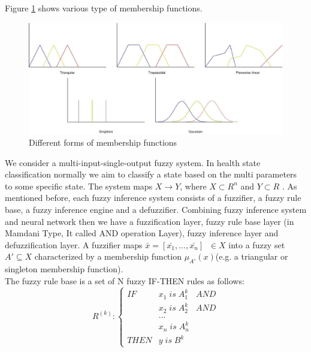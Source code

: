 Figure \ref{fig:Different forms of membership functions} shows various type of membership functions.
\begin{figure}[H]
    \centering
    \includegraphics[width=12cm]{gfx/membership_function.png}
    \vspace{0.3cm}
    \captionsetup{justification=centering}
    \caption{Different forms of membership functions}
    \label{fig:Different forms of membership functions}
\end{figure}
\vspace*{-4mm}
We consider a multi-input-single-output fuzzy system. In health state classification normally we aim to classify a state based on the multi parameters to some specific state. The system maps $X\rightarrow Y$, where $X\subset R^{n}$ and $Y \subset R$ . As mentioned before, each fuzzy inference system consists of a fuzzifier, a fuzzy rule base, a fuzzy inference engine and a defuzzifier. Combining fuzzy inference system and neural network then we have a fuzzification layer, fuzzy rule base layer (in Mamdani Type, It called AND operation Layer), fuzzy inference layer and defuzzification layer. A fuzzifier maps $\bar{x}=\left[\bar{x_{1}},...,\bar{x_{n}}\right]\;\;\in X$ into a fuzzy set ${A}'\subseteq X$ characterized by a membership function $\mu_{{A}'}\left(x\right)$(e.g. a triangular or singleton membership function).
\\
The fuzzy rule base is a set of N fuzzy IF-THEN rules as follows:
\begin{equation}
   R^{\left ( k \right )} : \left\{\begin{matrix}
IF   & x_{1} \; is\; A_{1}^{k} & AND \\ 
     & x_{2}\; is\; A_{2}^{k} & AND \\ 
     & ...  & \\ 
     & x_{n}\; is\; A_{n}^{k} & \\
THEN & y\; is\; B^{k} & 
\end{matrix}\right. 
\end{equation} 
